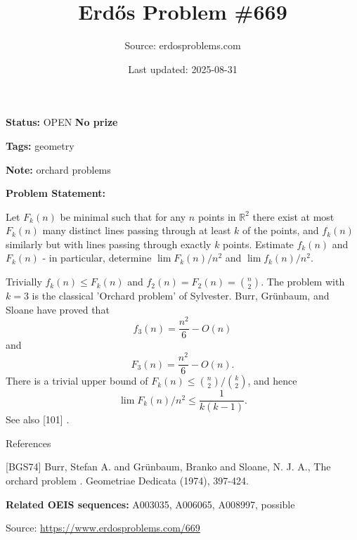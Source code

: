 \documentclass{article}
\title{Erd\H{o}s Problem \#669}
\date{Last updated: 2025-08-31}
\author{Source: erdosproblems.com}
\begin{document}
\maketitle

\noindent\textbf{Status:} OPEN \quad \textbf{No prize}

\noindent\textbf{Tags:} geometry

\medskip
\noindent\textbf{Note:} orchard problems

\medskip

\noindent\textbf{Problem Statement:}

Let $F_k(n)$ be minimal such that for any $n$ points in $\mathbb{R}^2$ there exist at most $F_k(n)$ many distinct lines passing through at least $k$ of the points, and $f_k(n)$ similarly but with lines passing through exactly $k$ points. Estimate $f_k(n)$ and $F_k(n)$ - in particular, determine $\lim F_k(n)/n^2$ and $\lim f_k(n)/n^2$.




Trivially $f_k(n)\leq F_k(n)$ and $f_2(n)=F_2(n)=\binom{n}{2}$. The problem with $k=3$ is the classical 'Orchard problem' of Sylvester. Burr, Gr\"{u}nbaum, and Sloane \cite{BGS74} have proved that\[f_3(n)=\frac{n^2}{6}-O(n)\]and\[F_3(n)=\frac{n^2}{6}-O(n).\]There is a trivial upper bound of $F_k(n) \leq \binom{n}{2}/\binom{k}{2}$, and hence\[\lim F_k(n)/n^2 \leq \frac{1}{k(k-1)}.\]See also [101] .




References

[BGS74] Burr, Stefan A. and Gr\"{u}nbaum, Branko and Sloane, N. J. A., The orchard problem . Geometriae Dedicata (1974), 397-424.

\noindent\textbf{Related OEIS sequences:} A003035, A006065, A008997, possible


\bigskip
\noindent\small{Source: \url{https://www.erdosproblems.com/669}}
\end{document}
